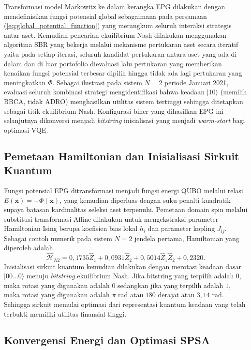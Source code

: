 Transformasi model Markowitz ke dalam kerangka EPG dilakukan dengan mendefinisikan fungsi potensial global sebagaimana pada persamaan (\ref{eq:global_potential_function}) yang merangkum seluruh interaksi strategis antar aset. Kemudian pencarian ekuilibrium Nash dilakukan menggunakan algoritma SBR yang bekerja melalui mekanisme pertukaran aset secara iteratif yaitu pada setiap iterasi, seluruh kandidat pertukaran antara aset yang ada di dalam dan di luar portofolio dievaluasi lalu pertukaran yang memberikan kenaikan fungsi potensial terbesar dipilih hingga tidak ada lagi pertukaran yang meningkatkan $\Phi$. Sebagai ilustrasi pada sistem $N=2$ periode Januari 2021, evaluasi seluruh kombinasi strategi mengidentifikasi bahwa keadaan $|10\rangle$ (memilih BBCA, tidak ADRO) menghasilkan utilitas sistem tertinggi sehingga ditetapkan sebagai titik ekuilibrium Nash. Konfigurasi biner yang dihasilkan EPG ini selanjutnya dikonversi menjadi \textit{bitstring} inisialisasi yang menjadi \textit{warm-start} bagi optimasi VQE.

\subsection{Pemetaan Hamiltonian dan Inisialisasi Sirkuit Kuantum}

Fungsi potensial EPG ditransformasi menjadi fungsi energi QUBO melalui relasi $E(\mathbf{x}) = -\Phi(\mathbf{x})$, yang kemudian diperluas dengan suku penalti kuadratik supaya batasan kardinalitas seleksi aset terpenuhi. Pemetaan domain spin melalui substitusi transformasi Affine dilakukan untuk mengekstraksi parameter Hamiltonian Ising berupa koefisien bias lokal $h_i$ dan parameter kopling $J_{ij}$. Sebagai contoh numerik pada sistem $N=2$ jendela pertama, Hamiltonian yang diperoleh adalah 
\begin{equation*}
    \hat{\mathcal{H}}_{N2} = 0{,}1735\hat{Z}_1 + 0{,}0931\hat{Z}_2 + 0{,}5014\hat{Z}_1\hat{Z}_2 + 0{,}2320.
\end{equation*}
Inisialisasi sirkuit kuantum kemudian dilakukan dengan merotasi keadaan dasar $|00\ldots0\rangle$ menuju \textit{bitstring} ekuilibrium Nash. Jika bitstring yang terpilih adalah $0$, maka rotasi yang digunakan adalah $0$ sedangkan jika yang terpilih adalah $1$, maka rotasi yang digunakan adalah $\pi$ rad atau $180$ derajat atau $3,14$ rad. Sehingga sirkuit memulai optimasi dari representasi kuantum keadaan yang telah terbukti memiliki utilitas finansial tinggi.

\subsection{Konvergensi Energi dan Optimasi SPSA}

